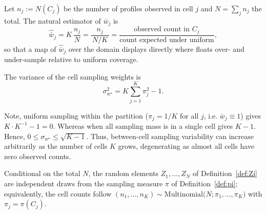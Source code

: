 Let $n_j:=N(C_j)$ be the number of profiles observed in cell $j$ and
$N=\sum_j n_j$ the total. The natural estimator of $\bar w_j$ is
\begin{equation}
  \widehat{\bar w}_j=K\,\frac{n_j}{N}=\frac{n_j}{\,N/K\,}
  =\frac{\text{observed count in }C_j}{\text{count expected under uniform}} ,
  \label{eq:wbar-hat}
\end{equation}
so that a map of $\widehat{\bar w}_j$ over the domain displays directly
where floats over- and under-sample relative to uniform coverage.

\begin{lemma}
\label{lem:sigmawcell}
The variance of the cell sampling weights is
\[
  \sigma^2_{w^{\star}} = K\sum_{j=1}^{K}\pi_j^2-1 .
\]
\end{lemma}

Note, uniform sampling within the partition ($\pi_j=1/K$ for all $j$, i.e.
$\bar w_j\equiv1$) gives $K\cdot K^{-1}-1=0$.
Whereas when all sampling mass is in a single cell gives $K-1$.
Hence, $0\le\sigma_{w^{\star}}\le\sqrt{K-1}$.
Thus, between-cell sampling variability can increase arbitrarily as the number of cells $K$ grows, degenerating as almost all cells have zero observed counts.

\begin{assumption}
\label{ass:sample-pi}
Conditional on the total $N$, the random elements $Z_1,\dots,Z_N$ of
Definition~\ref{def:Zi} are independent draws from the sampling measure
$\pi$ of Definition~\ref{def:pi}; equivalently, the cell counts follow
$(n_1,\dots,n_K)\sim\mathrm{Multinomial}\big(N;\pi_1,\dots,\pi_K\big)$
with $\pi_j=\pi(C_j)$.
\end{assumption}

